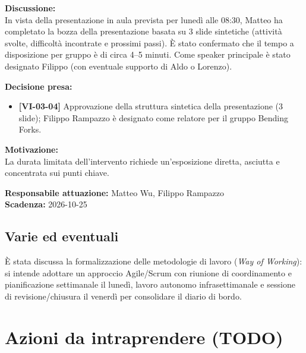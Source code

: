 \documentclass[12pt,a4paper]{article}
\newcommand{\tightlist}{\setlength{\itemsep}{1pt}\setlength{\parskip}{0pt}}
\begin{document}
\textbf{Discussione:} \\
In vista della presentazione in aula prevista per lunedì alle 08:30, Matteo ha completato la bozza della presentazione basata su 3 slide sintetiche (attività svolte, difficoltà incontrate e prossimi passi). È stato confermato che il tempo a disposizione per gruppo è di circa 4--5 minuti. Come speaker principale è stato designato Filippo (con eventuale supporto di Aldo o Lorenzo).

\textbf{Decisione presa:}
\begin{itemize}
\tightlist
\item[$\checkmark$] \textbf{[VI-03-04]} Approvazione della struttura sintetica della presentazione (3 slide); Filippo Rampazzo è designato come relatore per il gruppo Bending Forks.
\end{itemize}

\textbf{Motivazione:} \\
La durata limitata dell'intervento richiede un'esposizione diretta, asciutta e concentrata sui punti chiave.

\textbf{Responsabile attuazione:} Matteo Wu, Filippo Rampazzo \\
\textbf{Scadenza:} 2026-10-25

\hypertarget{varie-ed-eventuali}{%
\subsection{Varie ed eventuali}}
È stata discussa la formalizzazione delle metodologie di lavoro (\emph{Way of Working}): si intende adottare un approccio Agile/Scrum con riunione di coordinamento e pianificazione settimanale il lunedì, lavoro autonomo infrasettimanale e sessione di revisione/chiusura il venerdì per consolidare il diario di bordo.

\newpage
\hypertarget{azioni-da-intraprendere}{%
\section{Azioni da intraprendere (TODO)}}
\end{document}
